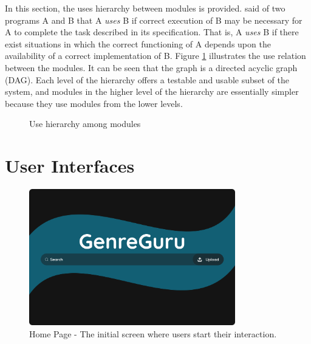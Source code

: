 \documentclass[12pt, titlepage]{article}
\begin{document}
In this section, the uses hierarchy between modules is
provided. \citet{Parnas1978} said of two programs A and B that A {\em uses} B if
correct execution of B may be necessary for A to complete the task described in
its specification. That is, A {\em uses} B if there exist situations in which
the correct functioning of A depends upon the availability of a correct
implementation of B.  Figure \ref{FigUH} illustrates the use relation between
the modules. It can be seen that the graph is a directed acyclic graph
(DAG). Each level of the hierarchy offers a testable and usable subset of the
system, and modules in the higher level of the hierarchy are essentially simpler
because they use modules from the lower levels.



\begin{figure}[H]
\centering
\caption{Use hierarchy among modules}
\label{FigUH}
\end{figure}


\section{User Interfaces}


\begin{figure}[h!]
    \centering
    \includegraphics[width=0.8\textwidth]{UI_Images/Home_Page.png}
    \caption{Home Page - The initial screen where users start their interaction.}
    \label{fig:home_page}
\end{figure}
\end{document}
